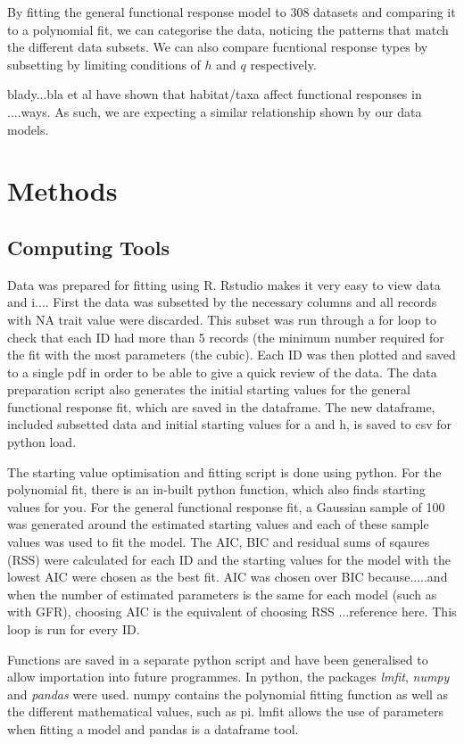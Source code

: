 \documentclass[11pt, a4paper, titlepage]{article}
\begin{document}
By fitting the general functional response model to 308 datasets and comparing it to a polynomial fit, we can categorise the data, noticing the patterns
that match the different data subsets. We can also compare fucntional response types by subsetting by limiting conditions of $h$ and $q$ respectively.

blady...bla et al have shown that habitat/taxa affect functional responses in ....ways. As such, we are expecting a similar relationship shown by 
our data models.

\section{Methods}

\subsection{Computing Tools}

Data was prepared for fitting using R. Rstudio makes it very easy to view data and i.... First the data was subsetted by the necessary columns and all records with NA trait value were discarded. This subset was run through a for loop to check that each ID had more than 5 records (the minimum number required for the fit with the most parameters (the cubic). Each ID was then plotted and saved to a single pdf in order to be able to give a quick review of the data. The data preparation script also generates the initial starting values for the general functional response fit, which are saved in the dataframe. The new dataframe, included subsetted data and initial starting values for a and h, is saved to csv for python load.

The starting value optimisation and fitting script is done using python. For the polynomial fit, there is an in-built python function, which also finds starting values for you. For the general functional response fit, a Gaussian sample of 100 was generated around the estimated starting values and each of these sample values was used to fit the model. The AIC, BIC and residual sums of sqaures (RSS) were calculated for each ID and the starting values for the model with the lowest AIC were chosen as the best fit. AIC was chosen over BIC because.....and when the number of estimated parameters is the same for each model (such as with GFR), choosing AIC is the equivalent of choosing RSS ...reference here. This loop is run for every ID.

Functions are saved in a separate python script and have been generalised to allow importation into future programmes. In python, the packages \textit{lmfit}, \textit{numpy} and \textit{pandas} were used. numpy contains the polynomial fitting function as well as the different mathematical values, such as pi. lmfit allows the use of parameters when fitting a model and pandas is a dataframe tool.
\end{document}
